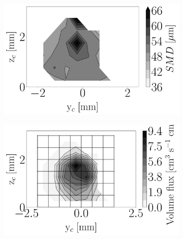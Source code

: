 \begin{figure}[h!]
\centering
\begin{subfigure}[b]{0.3\textwidth}
	\centering
   \includegraphics[scale=\scaleSLIBIMER]{./part3_applications/figures_ch8_resolved/injectors_SLI/dx15_xD05p00_SMD_map}
\end{subfigure}
   \hspace{0.17in}
\begin{subfigure}[b]{0.3\textwidth}
	\centering
   \includegraphics[scale=\scaleSLIBIMER]{./part3_applications/figures_ch8_resolved/injectors_SLI/dx15_xD05p00_volume_flux_map}
\end{subfigure}
   \hspace{0.17in}
\begin{subfigure}[b]{0.3\textwidth}
	\centering

\end{subfigure}
\end{figure}
